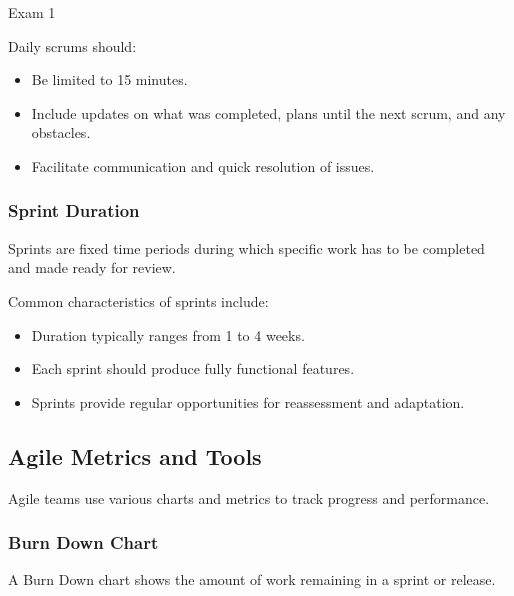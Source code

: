 \begin{examnotes}{Exam 1}
    \begin{highlight}
        Daily scrums should:
        
        \begin{itemize}
            \item Be limited to 15 minutes.
            \item Include updates on what was completed, plans until the next scrum, and any obstacles.
            \item Facilitate communication and quick resolution of issues.
        \end{itemize}
    \end{highlight}
    
    \subsubsection*{Sprint Duration}
    
    Sprints are fixed time periods during which specific work has to be completed and made ready for review.
    
    \begin{highlight}
        Common characteristics of sprints include:
        
        \begin{itemize}
            \item Duration typically ranges from 1 to 4 weeks.
            \item Each sprint should produce fully functional features.
            \item Sprints provide regular opportunities for reassessment and adaptation.
        \end{itemize}
    \end{highlight}
    
    \subsection*{Agile Metrics and Tools}
    
    Agile teams use various charts and metrics to track progress and performance.
    
    \subsubsection*{Burn Down Chart}
    
    A Burn Down chart shows the amount of work remaining in a sprint or release.
    

\end{examnotes}
